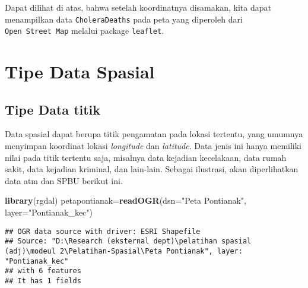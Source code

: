 \documentclass[
]{book}
\newenvironment{Shaded}{\begin{snugshade}}{\end{snugshade}}
\newcommand{\DataTypeTok}[1]{\textcolor[rgb]{0.13,0.29,0.53}{#1}}
\newcommand{\DecValTok}[1]{\textcolor[rgb]{0.00,0.00,0.81}{#1}}
\newcommand{\KeywordTok}[1]{\textcolor[rgb]{0.13,0.29,0.53}{\textbf{#1}}}
\newcommand{\NormalTok}[1]{#1}
\newcommand{\OperatorTok}[1]{\textcolor[rgb]{0.81,0.36,0.00}{\textbf{#1}}}
\newcommand{\StringTok}[1]{\textcolor[rgb]{0.31,0.60,0.02}{#1}}
\begin{document}
Dapat dilihat di atas, bahwa setelah koordinatnya disamakan, kita dapat menampilkan data \texttt{CholeraDeaths} pada peta yang diperoleh dari \texttt{Open\ Street\ Map} melalui package \texttt{leaflet}.

\hypertarget{tipe-data-spasial}{%
\section{Tipe Data Spasial}\label{tipe-data-spasial}}

\hypertarget{tipe-data-titik}{%
\subsection{Tipe Data titik}\label{tipe-data-titik}}

Data spasial dapat berupa titik pengamatan pada lokasi tertentu, yang umumnya menyimpan koordinat lokasi \emph{longitude} dan \emph{latitude}. Data jenis ini hanya memiliki nilai pada titik tertentu saja, misalnya data kejadian kecelakaan, data rumah sakit, data kejadian kriminal, dan lain-lain. Sebagai ilustrasi, akan diperlihatkan data atm dan SPBU berikut ini.

\begin{Shaded}
\begin{Highlighting}[]
\KeywordTok{library}\NormalTok{(rgdal)}
\NormalTok{petapontianak=}\KeywordTok{readOGR}\NormalTok{(}\DataTypeTok{dsn=}\StringTok{"Peta Pontianak"}\NormalTok{, }\DataTypeTok{layer=}\StringTok{"Pontianak\_kec"}\NormalTok{)}
\end{Highlighting}
\end{Shaded}

\begin{verbatim}
## OGR data source with driver: ESRI Shapefile 
## Source: "D:\Research (eksternal dept)\pelatihan spasial (adj)\modeul 2\Pelatihan-Spasial\Peta Pontianak", layer: "Pontianak_kec"
## with 6 features
## It has 1 fields
\end{verbatim}

\begin{Shaded}
\end{Shaded}
\end{document}
